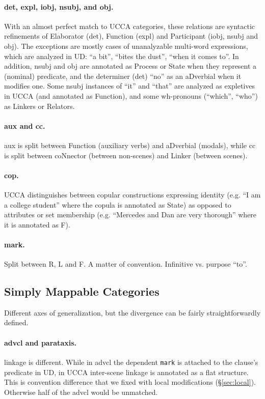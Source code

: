 \documentclass[11pt,a4paper]{article}
\begin{document}
\paragraph{det, expl, iobj, nsubj, and obj.}
With an almost perfect match to UCCA categories,
these relations are syntactic refinements of
Elaborator (det), Function (expl) and Participant (iobj, nsubj and obj).
The exceptions are mostly cases of unanalyzable multi-word expressions,
which are analyzed in UD: ``a bit'', ``bites the dust'', ``when it comes to''.
In addition, nsubj and obj are annotated as Process or State when they
represent a (nominal) predicate,
and the determiner (det) ``no'' as an aDverbial when it modifies one.
Some nsubj instances of ``it'' and ``that''
are analyzed as expletives in UCCA (and annotated as Function),
and some wh-pronouns (``which'', ``who'') as Linkers or Relators.

\paragraph{aux and cc.}
aux is split between Function (auxiliary verbs) and aDverbial (modals),
while cc is split between coNnector (between non-scenes) and Linker (between scenes).

\paragraph{cop.}
UCCA distinguishes between copular constructions expressing
identity (e.g. ``I am a college student'' where the copula is annotated as State)
as opposed to attributes or set membership
(e.g. ``Mercedes and Dan are very thorough'' where it is annotated as F).

\paragraph{mark.}
Split between R, L and F. A matter of convention.
Infinitive vs. purpose ``to''. 


\subsection{Simply Mappable Categories}

Different axes of generalization, but the divergence can be fairly straightforwardly defined.

\paragraph{advcl and parataxis.}
linkage is different.
While in advcl the dependent \verb|mark| is attached to the clause's predicate in UD,
in UCCA inter-scene linkage is annotated as a flat structure.
This is convention difference that we fixed with local modifications (\S\ref{sec:local}).
Otherwise half of the advcl would be unmatched.
\end{document}
